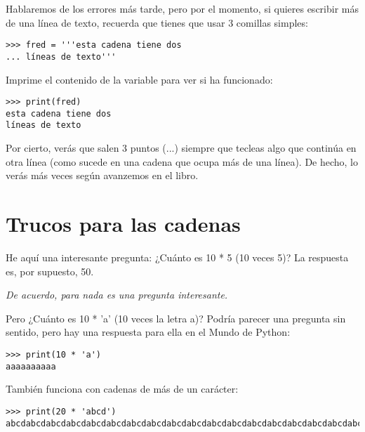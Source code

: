 Hablaremos de los errores más tarde, pero por el momento, si quieres escribir más de una línea de texto, recuerda que tienes que usar 3 comillas simples:

\begin{listing}
\begin{verbatim}
>>> fred = '''esta cadena tiene dos
... líneas de texto'''
\end{verbatim}
\end{listing}

\noindent
Imprime el contenido de la variable para ver si ha funcionado:

\begin{listing}
\begin{verbatim}
>>> print(fred)
esta cadena tiene dos
líneas de texto
\end{verbatim}
\end{listing}

Por cierto, verás que salen 3 puntos (...) siempre que tecleas algo que continúa en otra línea (como sucede en una cadena que ocupa más de una línea). De hecho, lo verás más veces según avanzemos en el libro.

\section{Trucos para las cadenas}\label{trickswithstrings}

He aquí una interesante pregunta: ¿Cuánto es 10 * 5 (10 veces 5)? La respuesta es, por supuesto, 50.

\noindent
\emph{De acuerdo, para nada es una pregunta interesante.}

Pero ¿Cuánto es 10 * 'a' (10 veces la letra a)? Podría parecer una pregunta sin sentido, pero hay una respuesta para ella en el Mundo de Python:

\begin{listing}
\begin{verbatim}
>>> print(10 * 'a')
aaaaaaaaaa
\end{verbatim}
\end{listing}

También funciona con cadenas de más de un carácter:

\begin{listing}
\begin{verbatim}
>>> print(20 * 'abcd')
abcdabcdabcdabcdabcdabcdabcdabcdabcdabcdabcdabcdabcdabcdabcdabcdabcdabcdabcdabcd
\end{verbatim}
\end{listing}

